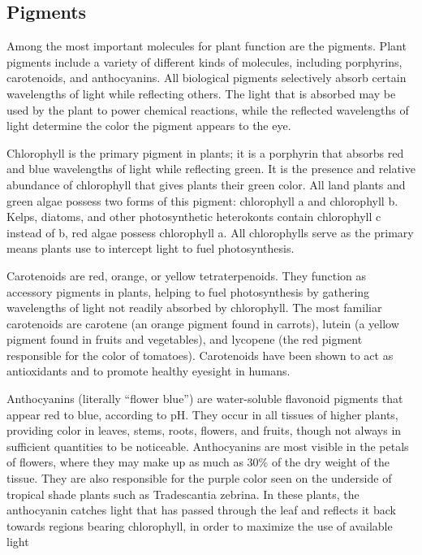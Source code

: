 \hypertarget{pigments}{%
\subsection{Pigments}\label{pigments}}

Among the most important molecules for plant function are the pigments. Plant pigments include a variety of different kinds of molecules, including porphyrins, carotenoids, and anthocyanins. All biological pigments selectively absorb certain wavelengths of light while reflecting others. The light that is absorbed may be used by the plant to power chemical reactions, while the reflected wavelengths of light determine the color the pigment appears to the eye.

Chlorophyll is the primary pigment in plants; it is a porphyrin that absorbs red and blue wavelengths of light while reflecting green. It is the presence and relative abundance of chlorophyll that gives plants their green color. All land plants and green algae possess two forms of this pigment: chlorophyll a and chlorophyll b. Kelps, diatoms, and other photosynthetic heterokonts contain chlorophyll c instead of b, red algae possess chlorophyll a. All chlorophylls serve as the primary means plants use to intercept light to fuel photosynthesis.

Carotenoids are red, orange, or yellow tetraterpenoids. They function as accessory pigments in plants, helping to fuel photosynthesis by gathering wavelengths of light not readily absorbed by chlorophyll. The most familiar carotenoids are carotene (an orange pigment found in carrots), lutein (a yellow pigment found in fruits and vegetables), and lycopene (the red pigment responsible for the color of tomatoes). Carotenoids have been shown to act as antioxidants and to promote healthy eyesight in humans.

Anthocyanins (literally ``flower blue'') are water-soluble flavonoid pigments that appear red to blue, according to pH. They occur in all tissues of higher plants, providing color in leaves, stems, roots, flowers, and fruits, though not always in sufficient quantities to be noticeable. Anthocyanins are most visible in the petals of flowers, where they may make up as much as 30\% of the dry weight of the tissue. They are also responsible for the purple color seen on the underside of tropical shade plants such as Tradescantia zebrina. In these plants, the anthocyanin catches light that has passed through the leaf and reflects it back towards regions bearing chlorophyll, in order to maximize the use of available light

